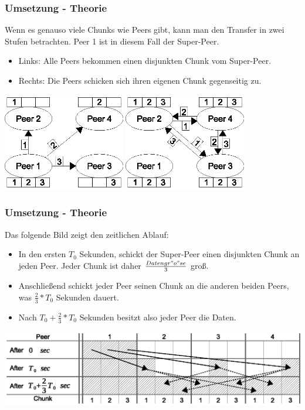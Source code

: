 \begin{frame}
  \frametitle{Umsetzung - Theorie}
  Wenn es genauso viele Chunks wie Peers gibt, kann man den Transfer in zwei Stufen betrachten. Peer 1 ist in diesem Fall der Super-Peer.
  \begin{itemize}
    \item Links: Alle Peers bekommen einen disjunkten Chunk vom Super-Peer. 
    \item Rechts: Die Peers schicken sich ihren eigenen Chunk gegenseitig zu. 
  \end{itemize}

  \begin{center}
    \includegraphics[width=0.4\textwidth]{fig/chunkedswarmmodel1.eps}
    \hspace{0.15\textwidth}
    \includegraphics[width=0.4\textwidth]{fig/chunkedswarmmodel2.eps}
  \end{center}
\end{frame}


\begin{frame}
  \frametitle{Umsetzung - Theorie}
  Das folgende Bild zeigt den zeitlichen Ablauf:
  \begin{itemize}
    \item In den ersten $T_0$ Sekunden, schickt der Super-Peer einen disjunkten Chunk an jeden Peer. Jeder Chunk ist daher $\frac{Datengr"o"se}{3}$ groß.
    \item Anschließend schickt jeder Peer seinen Chunk an die anderen beiden Peers, was $\frac{2}{3} * T_0$ Sekunden dauert.
    \item Nach $T_0 + \frac{2}{3} * T_0$ Sekunden besitzt also jeder Peer die Daten.
  \end{itemize}

  \begin{center}
    \includegraphics[width=1\textwidth]{fig/chunkedswarmformula1.eps}
  \end{center}
\end{frame}



